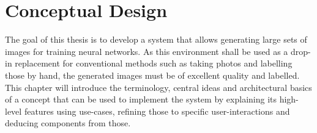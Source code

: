 
\chapter{Conceptual Design}
\label{chap:conceptual-design}
The goal of this thesis is to develop a system that allows generating large sets of images for training neural networks. As this environment shall be used as a drop-in replacement for conventional methods such as taking photos and labelling those by hand, the generated images must be of excellent quality and labelled.\\
This chapter will introduce the terminology, central ideas and architectural basics of a concept that can be used to implement the system by explaining its high-level features using use-cases, refining those to specific user-interactions and deducing components from those. 

